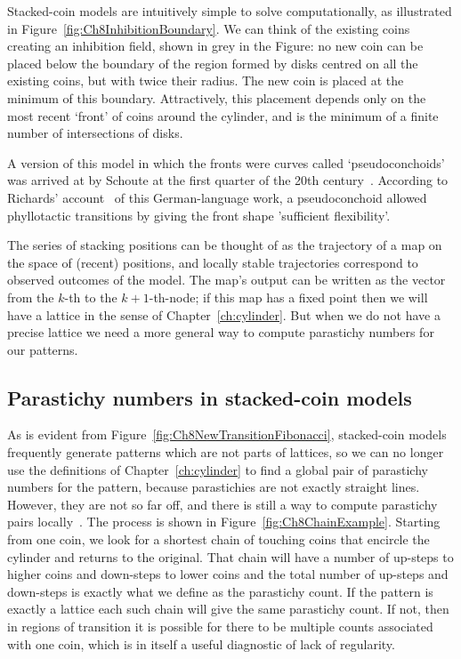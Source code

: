 \clearpage


Stacked-coin models are intuitively simple to solve computationally, as illustrated in Figure~\ref{fig:Ch8InhibitionBoundary}. We can 
 think of the existing coins creating an inhibition field, shown in grey in the Figure: no new coin can be placed below the boundary of the region formed by disks centred on all the existing coins, but with twice their radius. The new coin is placed at the minimum of this boundary.  Attractively, this placement depends only on the most recent `front' of coins around the cylinder, and is the minimum of a finite number of intersections of disks.
 
 A version of this model in which the fronts were curves called `pseudoconchoids'  was  arrived at by Schoute at the first quarter of the 20th century~\cite{schouteUberPseudokonchoiden1913}. According to  Richards' account~\cite{richardsGeometryPhyllotaxisIts1948}  of this German-language work, a pseudoconchoid allowed phyllotactic transitions by giving the front shape 'sufficient flexibility'. 
  
 The series of stacking positions can be thought of as the trajectory of a map on the space of (recent) positions, and locally stable trajectories correspond to observed outcomes of the model. The map's output can be written as the vector from the $k$-th to the $k+1$-th-node; if this map has a fixed point then we will have a lattice in the sense of Chapter~\ref{ch:cylinder}. 
%
But when we do not have a precise lattice we need a more general way to compute parastichy numbers for our patterns.

\subsection{Parastichy numbers in stacked-coin models}
As is evident from Figure~\ref{fig:Ch8NewTransitionFibonacci}, stacked-coin models frequently generate patterns which are not parts of lattices, so we can no longer use the  definitions of Chapter~\ref{ch:cylinder}
to find a global pair of parastichy numbers for the pattern, because  parastichies are not exactly straight lines.  However, they are not so far off, and there is still a way to compute parastichy pairs locally~\autocite{goleFibonacciQuasisymmetricPhyllotaxis2016}.
The process is shown in Figure~\ref{fig:Ch8ChainExample}. Starting from one coin, we look for a shortest chain of touching coins that encircle the cylinder and returns to the original. That chain will have a number of up-steps to higher coins and down-steps to lower coins and the total number of up-steps and down-steps is exactly what we define as the parastichy count. 
If the pattern is exactly a lattice each such chain will give the same parastichy count. If not, then in regions of transition it is possible for there to be multiple counts associated with one coin, which is in itself a useful diagnostic of lack of regularity.


